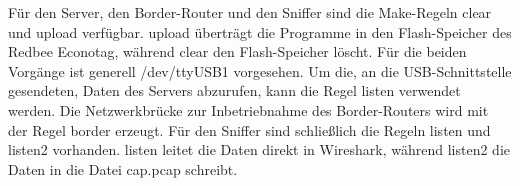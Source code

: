 Für den Server, den Border-Router und den Sniffer sind die Make-Regeln clear und upload verfügbar. upload überträgt die Programme in den
Flash-Speicher des Redbee Econotag, während clear den Flash-Speicher löscht. Für die beiden Vorgänge ist generell /dev/ttyUSB1 vorgesehen.
Um die, an die USB-Schnittstelle gesendeten, Daten des Servers abzurufen, kann die Regel listen verwendet werden. Die Netzwerkbrücke
zur Inbetriebnahme des Border-Routers wird mit der Regel border erzeugt. Für den Sniffer sind schließlich die Regeln listen und listen2
vorhanden. listen leitet die Daten direkt in Wireshark, während listen2 die Daten in die Datei cap.pcap schreibt.